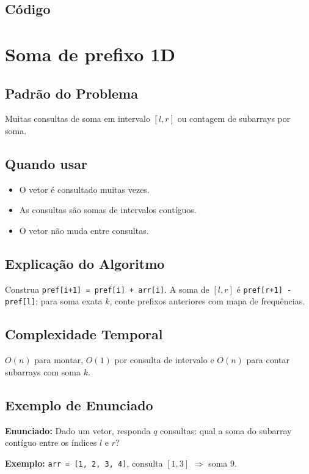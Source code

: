 \subsection{Código}

\section{Soma de prefixo 1D}

\subsection{Padrão do Problema}
Muitas consultas de soma em intervalo $[l,r]$ ou contagem de subarrays por soma.

\subsection{Quando usar}
\begin{itemize}[nosep]
  \item O vetor é consultado muitas vezes.
  \item As consultas são somas de intervalos contíguos.
  \item O vetor não muda entre consultas.
\end{itemize}

\subsection{Explicação do Algoritmo}
Construa \texttt{pref[i+1] = pref[i] + arr[i]}. A soma de $[l,r]$ é \texttt{pref[r+1] - pref[l]}; para soma exata $k$, conte prefixos anteriores com mapa de frequências.

\subsection{Complexidade Temporal}
$O(n)$ para montar, $O(1)$ por consulta de intervalo e $O(n)$ para contar subarrays com soma $k$.

\subsection{Exemplo de Enunciado}
\begin{exemplodiabox}
\textbf{Enunciado:} Dado um vetor, responda $q$ consultas: qual a soma do subarray contíguo entre os índices $l$ e $r$?

\textbf{Exemplo:} \texttt{arr = [1, 2, 3, 4]}, consulta $[1, 3]$ $\Rightarrow$ soma $9$.
\end{exemplodiabox}

